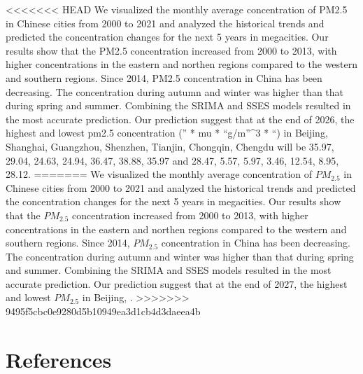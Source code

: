 \documentclass[
  12pt,
]{article}
\begin{document}
\textless\textless\textless\textless\textless\textless\textless{} HEAD
We visualized the monthly average concentration of PM2.5 in Chinese
cities from 2000 to 2021 and analyzed the historical trends and
predicted the concentration changes for the next 5 years in megacities.
Our results show that the PM2.5 concentration increased from 2000 to
2013, with higher concentrations in the eastern and northen regions
compared to the western and southern regions. Since 2014, PM2.5
concentration in China has been decreasing. The concentration during
autumn and winter was higher than that during spring and summer.
Combining the SRIMA and SSES models resulted in the most accurate
prediction. Our prediction suggest that at the end of 2026, the highest
and lowest pm2.5 concentration ('' * mu * ``g/m''\^{}3 * ``) in Beijing,
Shanghai, Guangzhou, Shenzhen, Tianjin, Chongqin, Chengdu will be 35.97,
29.04, 24.63, 24.94, 36.47, 38.88, 35.97 and 28.47, 5.57, 5.97, 3.46,
12.54, 8.95, 28.12. ======= We visualized the monthly average
concentration of \(PM_{2.5}\) in Chinese cities from 2000 to 2021 and
analyzed the historical trends and predicted the concentration changes
for the next 5 years in megacities. Our results show that the
\(PM_{2.5}\) concentration increased from 2000 to 2013, with higher
concentrations in the eastern and northen regions compared to the
western and southern regions. Since 2014, \(PM_{2.5}\) concentration in
China has been decreasing. The concentration during autumn and winter
was higher than that during spring and summer. Combining the SRIMA and
SSES models resulted in the most accurate prediction. Our prediction
suggest that at the end of 2027, the highest and lowest \(PM_{2.5}\) in
Beijing, .
\textgreater\textgreater\textgreater\textgreater\textgreater\textgreater\textgreater{}
9495f5cbc0e9280d5b10949ea3d1cb4d3daeea4b

\newpage

\hypertarget{references}{%
\section*{References}\label{references}}
\end{document}
